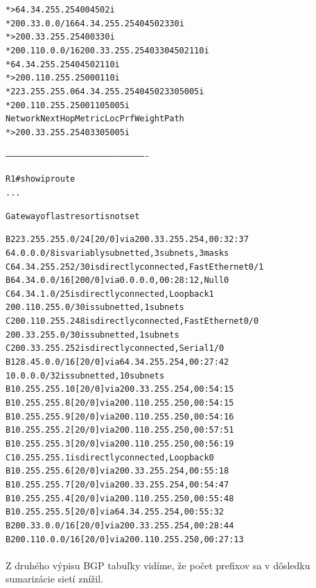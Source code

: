 \documentclass[12pt,twoside,a4paper]{report}
\begin{document}
{\begin{small}
\begin{alltt}
*>                  64.34.255.254            0             0 4502 i
*  200.33.0.0/16    64.34.255.254                          0 4502 330 i
*>                  200.33.255.254           0             0 330 i
*  200.110.0.0/16   200.33.255.254                         0 330 4502 110 i
*                   64.34.255.254                          0 4502 110 i
*>                  200.110.255.250          0             0 110 i
*  223.255.255.0    64.34.255.254                          0 4502 330 5005 i
*                   200.110.255.250                        0 110 5005 i
   Network          Next Hop            Metric LocPrf Weight Path
*>                  200.33.255.254                         0 330 5005 i


-------------------------------------------------------------------------------------


R1#show ip route
...

Gateway of last resort is not set

B    223.255.255.0/24 [20/0] via 200.33.255.254, 00:32:37
     64.0.0.0/8 is variably subnetted, 3 subnets, 3 masks
C       64.34.255.252/30 is directly connected, FastEthernet0/1
B       64.34.0.0/16 [200/0] via 0.0.0.0, 00:28:12, Null0
C       64.34.1.0/25 is directly connected, Loopback1
     200.110.255.0/30 is subnetted, 1 subnets
C       200.110.255.248 is directly connected, FastEthernet0/0
     200.33.255.0/30 is subnetted, 1 subnets
C       200.33.255.252 is directly connected, Serial1/0
B    128.45.0.0/16 [20/0] via 64.34.255.254, 00:27:42
     10.0.0.0/32 is subnetted, 10 subnets
B       10.255.255.10 [20/0] via 200.33.255.254, 00:54:15
B       10.255.255.8 [20/0] via 200.110.255.250, 00:54:15
B       10.255.255.9 [20/0] via 200.110.255.250, 00:54:16
B       10.255.255.2 [20/0] via 200.110.255.250, 00:57:51
B       10.255.255.3 [20/0] via 200.110.255.250, 00:56:19
C       10.255.255.1 is directly connected, Loopback0
B       10.255.255.6 [20/0] via 200.33.255.254, 00:55:18
B       10.255.255.7 [20/0] via 200.33.255.254, 00:54:47
B       10.255.255.4 [20/0] via 200.110.255.250, 00:55:48
B       10.255.255.5 [20/0] via 64.34.255.254, 00:55:32
B    200.33.0.0/16 [20/0] via 200.33.255.254, 00:28:44
B    200.110.0.0/16 [20/0] via 200.110.255.250, 00:27:13
\end{alltt}
\end{small}
}

\paragraph{}
Z druhého výpisu BGP tabuľky vidíme, že počet prefixov sa v dôsledku sumarizácie sietí znížil.
\end{document}

